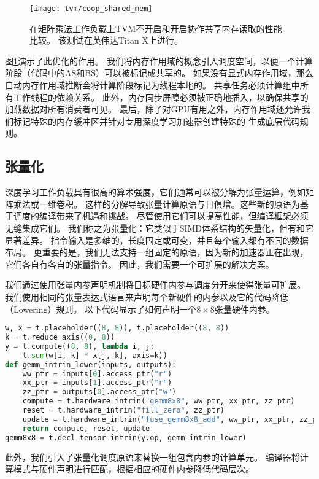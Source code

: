 \begin{figure}[htbp]
    \centering
    \texttt{[image: tvm/coop\_shared\_mem]}
    \caption{\label{fig:coop shared mem}在矩阵乘法工作负载上TVM不开启和开启协作共享内存读取的性能比较。
    该测试在英伟达Titan X上进行。}
\end{figure}

图\ref{fig:coop shared mem}演示了此优化的作用。
我们将内存作用域的概念引入调度空间，以便一个计算阶段（代码中的AS和BS）可以被标记成共享的。
如果没有显式内存作用域，那么自动内存作用域推断会将计算阶段标记为线程本地的。
共享任务必须计算组中所有工作线程的依赖关系。
此外，内存同步屏障必须被正确地插入，以确保共享的加载数据对所有消费者可见。
最后，除了对GPU有用之外，内存作用域还允许我们标记特殊的内存缓冲区并针对专用深度学习加速器创建特殊的
生成底层代码规则。

\subsection{张量化}
深度学习工作负载具有很高的算术强度，它们通常可以被分解为张量运算，例如矩阵乘法或一维卷积。
这样的分解导致张量计算原语与日俱增。这些新的原语为基于调度的编译带来了机遇和挑战。
尽管使用它们可以提高性能，但编译框架必须无缝集成它们。
我们称之为张量化：它类似于SIMD体系结构的矢量化，但有和它显著差异。
指令输入是多维的，长度固定或可变，并且每个输入都有不同的数据布局。
更重要的是，我们无法支持一组固定的原语，因为新的加速器正在出现，它们各自有各自的张量指令。
因此，我们需要一个可扩展的解决方案。

我们通过使用张量内参声明机制将目标硬件内参与调度分开来使得张量可扩展。
我们使用相同的张量表达式语言来声明每个新硬件的内参以及它的代码降低（Lowering）规则。
以下代码显示了如何声明一个$8\times 8$张量硬件内参。

\begin{lstlisting}[language={Python}]
w, x = t.placeholder((8, 8)), t.placeholder((8, 8))
k = t.reduce_axis((0, 8))
y = t.compute((8, 8), lambda i, j:
    t.sum(w[i, k] * x[j, k], axis=k))
def gemm_intrin_lower(inputs, outputs):
    ww_ptr = inputs[0].access_ptr("r")
    xx_ptr = inputs[1].access_ptr("r")
    zz_ptr = outputs[0].access_ptr("w")
    compute = t.hardware_intrin("gemm8x8", ww_ptr, xx_ptr, zz_ptr)
    reset = t.hardware_intrin("fill_zero", zz_ptr)
    update = t.hardware_intrin("fuse_gemm8x8_add", ww_ptr, xx_ptr, zz_ptr)
    return compute, reset, update
gemm8x8 = t.decl_tensor_intrin(y.op, gemm_intrin_lower) 
\end{lstlisting}

此外，我们引入了张量化调度原语来替换一组包含内参的计算单元。
编译器将计算模式与硬件声明进行匹配，根据相应的硬件内参降低代码层次。

